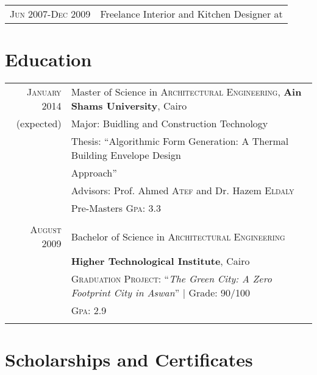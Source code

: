 \documentclass[a4paper,10pt]{article} %
\begin{document}
\begin{tabular}{r|p{11cm}}

\textsc{Jun 2007-Dec 2009} & Freelance Interior and Kitchen Designer at \emph{}\\
\end{tabular}


\section{Education}

\begin{tabular}{rl}	
\textsc{January} 2014 & Master of Science in \textsc{Architectural Engineering}, \textbf{Ain Shams University}, Cairo\\
(expected)& Major: Buidling and Construction Technology\\
& Thesis: ``Algorithmic Form Generation: A Thermal Building Envelope Design \\
& Approach'' \\
& \small Advisors: Prof. Ahmed \textsc{Atef} and Dr. Hazem \textsc{Eldaly}\\
&\normalsize Pre-Masters \textsc{Gpa}: 3.3\\
&\\


\textsc{August} 2009& Bachelor of Science in \textsc{Architectural Engineering} \\
& \normalsize\textbf{Higher Technological Institute}, Cairo\\
& \textsc{Graduation Project:} ``\emph{The Green City: A Zero Footprint City in Aswan}'' | \small Grade: 90/100\\
&\normalsize \textsc{Gpa}: 2.9 \\
&\\

\end{tabular}


\section{Scholarships and Certificates}
\end{document}
